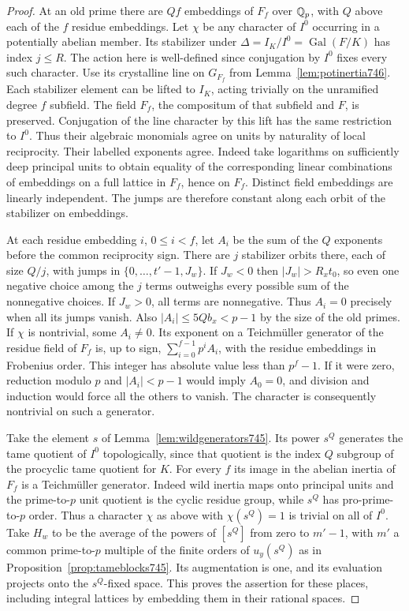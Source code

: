 \documentclass[a4paper,11pt]{article}
\theoremstyle{definition}
\theoremstyle{remark}
\numberwithin{equation}{section}
\begin{document}
\begin{proof}
At an old prime there are \(Qf\) embeddings of \(F_f\) over
\(\mathbb Q_p\), with \(Q\) above each of the \(f\) residue embeddings.
Let \(\chi\) be any character of \(I^0\) occurring in a potentially
abelian member. Its stabilizer under
\(\Delta=I_K/I^0=\operatorname{Gal}(F/K)\) has index \(j\le R\).
The action here is well-defined since conjugation by \(I^0\)
fixes every such character. Use its crystalline line on \(G_{F_f}\)
from Lemma~\ref{lem:potinertia746}. Each stabilizer element can
be lifted to \(I_K\), acting trivially on the unramified degree
\(f\) subfield. The field \(F_f\), the compositum of that subfield
and \(F\), is preserved. Conjugation of the line character by this
lift has the same restriction to \(I^0\). Thus their algebraic
monomials agree on units by naturality of local reciprocity.
Their labelled exponents agree. Indeed take logarithms on sufficiently
deep principal units to obtain equality of the corresponding
linear combinations of embeddings on a full lattice in \(F_f\),
hence on \(F_f\). Distinct field embeddings are linearly
independent. The jumps are therefore constant along each orbit
of the stabilizer on embeddings.

At each residue embedding \(i\), \(0\le i<f\), let \(A_i\)
be the sum of the \(Q\) exponents before the common reciprocity
sign. There are \(j\) stabilizer orbits there, each of size
\(Q/j\), with jumps in \(\{0,\ldots,t'-1,J_w\}\). If \(J_w<0\)
then \(|J_w|>R_xt_0\), so even one negative choice among the \(j\)
terms outweighs every possible sum of the nonnegative choices.
If \(J_w>0\), all terms are nonnegative. Thus \(A_i=0\) precisely
when all its jumps vanish. Also \(|A_i|\le5Qb_x<p-1\)
by the size of the old primes. If \(\chi\) is nontrivial,
some \(A_i\ne0\). Its exponent on a Teichm\"uller generator
of the residue field of \(F_f\) is, up to sign,
\(\sum_{i=0}^{f-1}p^i A_i\), with the residue embeddings in
Frobenius order. This integer has absolute value less than
\(p^f-1\). If it were zero, reduction modulo \(p\) and
\(|A_i|<p-1\) would imply \(A_0=0\), and division and induction
would force all the others to vanish. The character is consequently
nontrivial on such a generator.

Take the element \(s\) of Lemma~\ref{lem:wildgenerators745}.
Its power \(s^Q\) generates the tame quotient of \(I^0\)
topologically, since that quotient is the index \(Q\) subgroup
of the procyclic tame quotient for \(K\). For every \(f\)
its image in the abelian inertia of \(F_f\) is a Teichm\"uller
generator. Indeed wild inertia maps onto principal units and
the prime-to-\(p\) unit quotient is the cyclic residue group,
while \(s^Q\) has pro-prime-to-\(p\) order. Thus a character
\(\chi\) as above with \(\chi(s^Q)=1\) is trivial on all of \(I^0\).
Take \(H_w\) to be the average of the powers of \([s^Q]\) from
zero to \(m'-1\), with \(m'\) a common prime-to-\(p\) multiple
of the finite orders of \(u_y(s^Q)\) as in
Proposition~\ref{prop:tameblocks745}. Its augmentation is one,
and its evaluation projects onto the \(s^Q\)-fixed space. This
proves the assertion for these places, including integral
lattices by embedding them in their rational spaces.
\end{proof}
\end{document}

